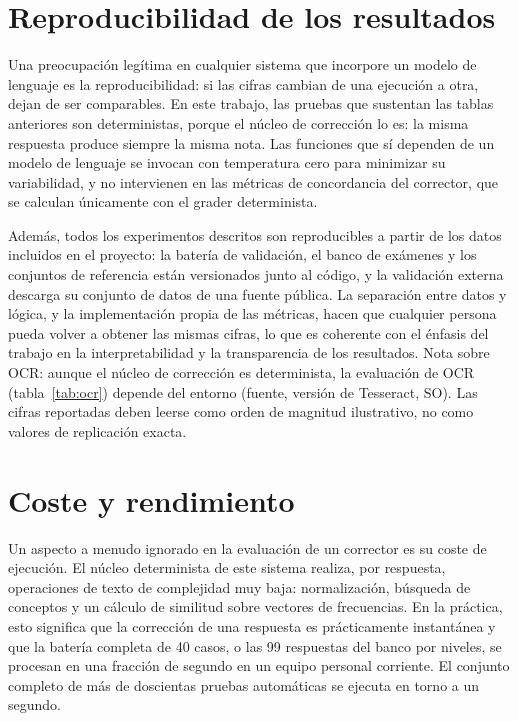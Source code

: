 \section{Reproducibilidad de los resultados}

Una preocupación legítima en cualquier sistema que incorpore un modelo de lenguaje es la reproducibilidad: si las cifras cambian de una ejecución a otra, dejan de ser comparables. En este trabajo, las pruebas que sustentan las tablas anteriores son deterministas, porque el núcleo de corrección lo es: la misma respuesta produce siempre la misma nota. Las funciones que sí dependen de un modelo de lenguaje se invocan con temperatura cero para minimizar su variabilidad, y no intervienen en las métricas de concordancia del corrector, que se calculan únicamente con el grader determinista.

Además, todos los experimentos descritos son reproducibles a partir de los datos incluidos en el proyecto: la batería de validación, el banco de exámenes y los conjuntos de referencia están versionados junto al código, y la validación externa descarga su conjunto de datos de una fuente pública. La separación entre datos y lógica, y la implementación propia de las métricas, hacen que cualquier persona pueda volver a obtener las mismas cifras, lo que es coherente con el énfasis del trabajo en la interpretabilidad y la transparencia de los resultados. Nota sobre OCR: aunque el núcleo de corrección es determinista, la evaluación de OCR (tabla~\ref{tab:ocr}) depende del entorno (fuente, versión de Tesseract, SO). Las cifras reportadas deben leerse como orden de magnitud ilustrativo, no como valores de replicación exacta.

\section{Coste y rendimiento}

Un aspecto a menudo ignorado en la evaluación de un corrector es su coste de ejecución. El núcleo determinista de este sistema realiza, por respuesta, operaciones de texto de complejidad muy baja: normalización, búsqueda de conceptos y un cálculo de similitud sobre vectores de frecuencias. En la práctica, esto significa que la corrección de una respuesta es prácticamente instantánea y que la batería completa de 40 casos, o las 99 respuestas del banco por niveles, se procesan en una fracción de segundo en un equipo personal corriente. El conjunto completo de más de doscientas pruebas automáticas se ejecuta en torno a un segundo.


